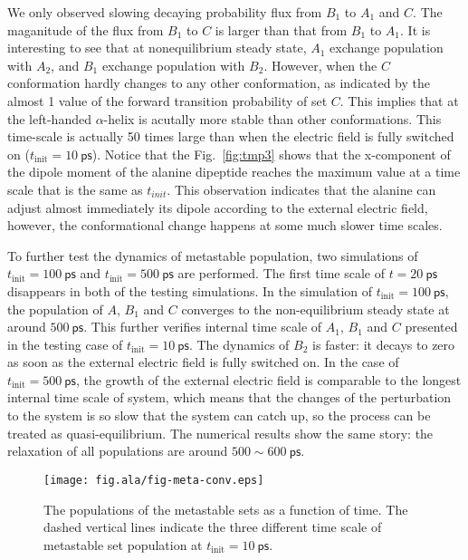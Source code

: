 \documentclass[aip,jcp,a4paper,preprint,onecolumn]{revtex4-1}
\begin{document}
We only observed slowing decaying probability flux from $B_1$ to $A_1$ and $C$.
The maganitude of the flux from $B_1$ to  $C$ is larger than that from  $B_1$ to  $A_1$.
It is interesting to see that at nonequilibrium steady state, $A_1$ exchange
population with $A_2$, and $B_1$ exchange
population with $B_2$. However, when the $C$ conformation hardly changes
to any other conformation, as indicated by the almost 1 value of the forward
transition probability of set $C$. This implies that at the left-handed $\alpha$-helix is
acutally more stable than  other conformations.
This time-scale is actually 50 times large than when the electric field
is fully switched on ($t_{\textrm{init}} = 10~\textsf{ps}$).
Notice that the Fig.~\ref{fig:tmp3}
shows that the x-component of the dipole moment of the alanine dipeptide
reaches the maximum value at a time scale  that is the same as
$t_{init}$. This observation indicates that the alanine can adjust almost immediately its
dipole according to the external electric field, however, the conformational change
happens at some much slower time scales.

To further test the dynamics of metastable population, two simulations
of $t_{\textrm{init}} = 100~\textsf{ps}$ and $t_{\textrm{init}} =
500~\textsf{ps}$ are performed. The first time scale of $t =
20~\textsf{ps}$ disappears in both of the testing simulations. In the
simulation of $t_{\textrm{init}} = 100~\textsf{ps}$, the population of
$A$, $B_1$ and $C$ converges to the non-equilibrium steady state at
around $500~\textsf{ps}$. This further verifies internal time scale of
$A_1$, $B_1$ and $C$ presented in the testing case of
$t_{\textrm{init}} = 10~\textsf{ps}$.  The dynamics of $B_2$ is
faster: it decays to zero as soon as the external electric field is fully
switched on. In the case of $t_{\textrm{init}} = 500~\textsf{ps}$, the
growth of the external electric field is comparable to the longest
internal time scale of system, which means that the changes of the
perturbation to the system is so slow that the system can catch up, so
the process can be treated as  quasi-equilibrium.
The numerical results show the same story: the relaxation
of all populations are around $500 \sim 600~\textsf{ps}$.




\begin{figure}
  \centering
  \texttt{[image: fig.ala/fig-meta-conv.eps]}
  \caption{The populations of the metastable sets as a function of time.
    The dashed vertical lines indicate the three different time scale of
  metastable set population at $t_{\textrm{init}} = 10~\textsf{ps}$.}
  \label{fig:tmp7}
\end{figure}
\end{document}
